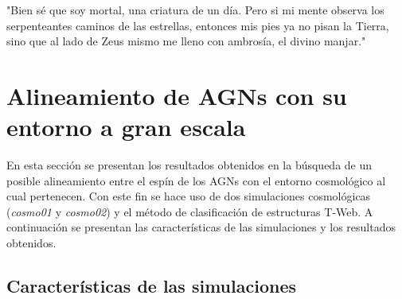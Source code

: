\begin{savequote}[60mm]
"Bien sé que soy mortal, una criatura de un día. Pero si mi mente observa los serpenteantes caminos de las estrellas, entonces mis pies ya no pisan la Tierra, sino que al lado de Zeus mismo me lleno con ambrosía, el divino manjar."
\end{savequote}




\chapter{Alineamiento de AGNs con su entorno a gran escala}
\label{cha:cosmic_web}

En esta sección se presentan los resultados obtenidos en la búsqueda de un posible alineamiento entre el espín de los AGNs con el entorno cosmológico al cual pertenecen. Con este fin  se hace uso de dos simulaciones cosmológicas ({\it{cosmo01}} y {\it{cosmo02}}) y el método  de clasificación de estructuras T-Web. A continuación se presentan las características de las simulaciones y  los resultados obtenidos.

\section{Características de las simulaciones}
\label{sec: propiedades en las simulaciones}

